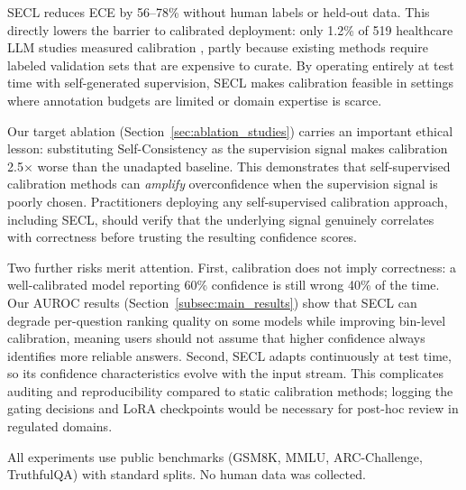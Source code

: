 \documentclass[11pt]{article}
\begin{document}
SECL reduces ECE by 56--78\% without human labels or held-out data. This directly lowers the barrier to calibrated deployment: only 1.2\% of 519 healthcare LLM studies measured calibration \cite{bedi_testing_2025}, partly because existing methods require labeled validation sets that are expensive to curate. By operating entirely at test time with self-generated supervision, SECL makes calibration feasible in settings where annotation budgets are limited or domain expertise is scarce.

Our target ablation (Section~\ref{sec:ablation_studies}) carries an important ethical lesson: substituting Self-Consistency as the supervision signal makes calibration 2.5$\times$ worse than the unadapted baseline. This demonstrates that self-supervised calibration methods can \emph{amplify} overconfidence when the supervision signal is poorly chosen. Practitioners deploying any self-supervised calibration approach, including SECL, should verify that the underlying signal genuinely correlates with correctness before trusting the resulting confidence scores.

Two further risks merit attention. First, calibration does not imply correctness: a well-calibrated model reporting 60\% confidence is still wrong 40\% of the time. Our AUROC results (Section~\ref{subsec:main_results}) show that SECL can degrade per-question ranking quality on some models while improving bin-level calibration, meaning users should not assume that higher confidence always identifies more reliable answers. Second, SECL adapts continuously at test time, so its confidence characteristics evolve with the input stream. This complicates auditing and reproducibility compared to static calibration methods; logging the gating decisions and LoRA checkpoints would be necessary for post-hoc review in regulated domains.

All experiments use public benchmarks (GSM8K, MMLU, ARC-Challenge, TruthfulQA) with standard splits. No human data was collected.

\newpage


\clearpage
\appendix

\end{document}
